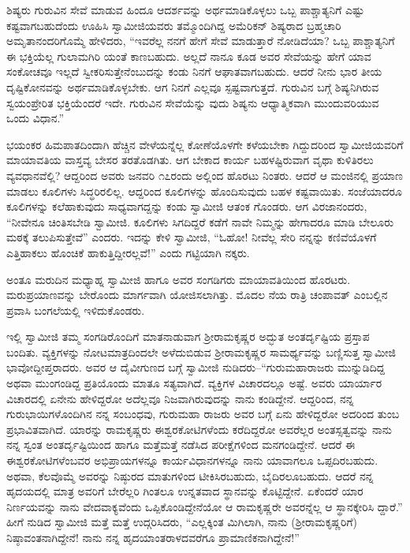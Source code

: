 ಶಿಷ್ಯರು ಗುರುವಿನ ಸೇವೆ ಮಾಡುವ ಹಿಂದೂ ಆದರ್ಶವನ್ನು ಅರ್ಥಮಾಡಿಕೊಳ್ಳಲು ಒಬ್ಬ ಪಾಶ್ಚಾತ್ಯನಿಗೆ ಎಷ್ಟು ಕಷ್ಟವಾಗಬಹುದೆಂದು ಊಹಿಸಿ ಸ್ವಾಮೀಜಿಯವರು ತಮ್ಮೊಂದಿಗಿದ್ದ ಅಮೆರಿಕನ್ ಶಿಷ್ಯರಾದ ಬ್ರಹ್ಮಚಾರಿ ಅಮೃತಾನಂದರಿಗೊಮ್ಮೆ ಹೇಳಿದರು, “ಇವರೆಲ್ಲ ನನಗೆ ಹೇಗೆ ಸೇವೆ ಮಾಡುತ್ತಾರೆ ನೋಡಿದೆಯಾ? ಒಬ್ಬ ಪಾಶ್ಚಾತ್ಯನಿಗೆ ಈ ಭಕ್ತಿಯೆಲ್ಲ ಗುಲಾಮಗಿರಿ ಯಂತೆ ಕಾಣಬಹುದು. ಅಲ್ಲದೆ ನಾನೂ ಕೂಡ ಅವರ ಸೇವೆಯನ್ನು ಹೇಗೆ ಯಾವ ಸಂಕೋಚವೂ ಇಲ್ಲದೆ ಸ್ವೀಕರಿಸುತ್ತೇನೆಂಬುದನ್ನು ಕಂಡು ನಿನಗೆ ಆಘಾತವಾಗಬಹುದು. ಆದರೆ ನೀನು ಭಾರ ತೀಯ ದೃಷ್ಟಿಕೋನವನ್ನು ಅರ್ಥಮಾಡಿಕೊಳ್ಳಬೇಕು. ಆಗ ನಿನಗೆ ಎಲ್ಲವೂ ಸ್ಪಷ್ಟವಾಗುತ್ತದೆ. ಗುರುವಿನ ಬಗ್ಗೆ ಶಿಷ್ಯನಿಗಿರುವ ಸ್ವಯಂಪ್ರೇರಿತ ಭಕ್ತಿಯೆಂದರೆ ಇದೇ. ಗುರುವಿನ ಸೇವೆಯೆನ್ನು ವುದು ಶಿಷ್ಯನು ಆಧ್ಯಾತ್ಮಿಕವಾಗಿ ಮುಂದುವರಿಯುವ ಒಂದು ವಿಧಾನ.”

ಭಯಂಕರ ಹಿಮಪಾತದಿಂದಾಗಿ ಹೆಚ್ಚಿನ ವೇಳೆಯನ್ನೆಲ್ಲ ಕೋಣೆಯೊಳಗೇ ಕಳೆಯಬೇಕಾ ಗಿದ್ದುದರಿಂದ ಸ್ವಾಮೀಜಿಯವರಿಗೆ ಮಾಯಾವತಿಯ ವಾಸ್ತವ್ಯ ಬೇಸರ ತರತೊಡಗಿತು. ಆಗ ಬೇಕಾದ ಕಾರ್ಯ ಬಹಳಷ್ಟಿರುವಾಗ ವೃಥಾ ಕುಳಿತಿರಲು ವ್ಯವಧಾನವೆಲ್ಲಿ? ಆದ್ದರಿಂದ ಅವರು ಜನವರಿ ೧೭ರಂದು ಅಲ್ಲಿಂದ ಹೊರಟು ನಿಂತರು. ಆದರೆ ಆ ಮಂಜಿನಲ್ಲಿ ಪ್ರಯಾಣ ಮಾಡಲು ಕೂಲಿಗಳು ಸಿದ್ಧರಿರಲಿಲ್ಲ. ಆದ್ದರಿಂದ ಕೂಲಿಗಳನ್ನು ಹೊಂದಿಸುವುದು ಬಹಳ ಕಷ್ಟವಾಯಿತು. ಸಂಜೆಯಾದರೂ ಕೂಲಿಗಳನ್ನು ಕಲೆಹಾಕುವುದು ಸಾಧ್ಯವಾಗದ್ದನ್ನು ಕಂಡು ಸ್ವಾಮೀಜಿ ಆತಂಕ ಗೊಂಡರು. ಆಗ ವಿರಜಾನಂದರು, “ನೀವೇನೂ ಚಿಂತಿಸಬೇಡಿ ಸ್ವಾಮೀಜಿ. ಕೂಲಿಗಳು ಸಿಗದಿದ್ದರೆ ಕಡೆಗೆ ನಾವೇ ನಿಮ್ಮನ್ನು ಹೇಗಾದರೂ ಮಾಡಿ ಬೇಲೂರು ಮಠಕ್ಕೆ ತಲುಪಿಸುತ್ತೇವೆ” ಎಂದರು. ಇದನ್ನು ಕೇಳಿ ಸ್ವಾಮೀಜಿ, “ಓಹೋ! ನೀವೆಲ್ಲ ಸೇರಿ ನನ್ನನ್ನು ಕಣಿವೆಯೊಳಗೆ ಎತ್ತಿಹಾಕಲು ಹೊಂಚಿಕೆ ಹಾಕುತ್ತಿದ್ದೀರಲ್ಲವೆ!” ಎಂದು ಗಟ್ಟಿಯಾಗಿ ನಕ್ಕರು.

ಅಂತೂ ಮರುದಿನ ಮಧ್ಯಾಹ್ನ ಸ್ವಾಮೀಜಿ ಹಾಗೂ ಅವರ ಸಂಗಡಿಗರು ಮಾಯಾವತಿಯಿಂದ ಹೊರಟರು. ಮರುಪ್ರಯಾಣವನ್ನು ಬೇರೊಂದು ಮಾರ್ಗವಾಗಿ ಯೋಜಿಸಲಾಗಿತ್ತು. ಮೊದಲ ನೆಯ ರಾತ್ರಿ ಚಂಪಾವತ್ ಎಂಬಲ್ಲಿನ ಪ್ರವಾಸಿ ಬಂಗಲೆಯಲ್ಲಿ ಇಳಿದುಕೊಂಡರು.

ಇಲ್ಲಿ ಸ್ವಾಮೀಜಿ ತಮ್ಮ ಸಂಗಡಿರೊಂದಿಗೆ ಮಾತನಾಡುವಾಗ ಶ್ರೀರಾಮಕೃಷ್ಣರ ಅದ್ಭುತ ಅಂತರ್ದೃಷ್ಟಿಯ ಪ್ರಸ್ತಾಪ ಬಂದಿತು. ವ್ಯಕ್ತಿಗಳನ್ನು ನೋಟಮಾತ್ರದಿಂದಲೇ ಅಳೆದುಬಿಡುವ ಶ್ರೀರಾಮಕೃಷ್ಣರ ಸಾಮರ್ಥ್ಯವನ್ನು ಬಣ್ಣಿಸುತ್ತ ಸ್ವಾಮೀಜಿ ಭಾವೋದ್ದೀಪ್ತರಾದರು. ಅವರ ಆ ದೈವೀಗುಣದ ಬಗ್ಗೆ ಸ್ವಾಮೀಜಿ ನುಡಿದರು–“ಗುರುಮಹಾರಾಜರು ಮುನ್ನುಡಿದಿದ್ದ ಅಥವಾ ಮುಂಗಂಡಿದ್ದ ಪ್ರತಿಯೊಂದು ಮಾತೂ ಸತ್ಯವಾಗಿದೆ. ವ್ಯಕ್ತಿಗಳ ವಿಚಾರದಲ್ಲೂ ಅಷ್ಟೆ. ಅವರು ಯಾರ್ಯಾರ ವಿಚಾರದಲ್ಲಿ ಏನೇನು ಹೇಳಿದ್ದರೋ ಅದೆಲ್ಲವೂ ನಿಜವಾಗಿರುವುದನ್ನು ನಾನು ಕಂಡಿದ್ದೇನೆ. ಆದ್ದರಿಂದ, ನನ್ನ ಗುರುಭಾಯಿಗಳೊಂದಿಗಿನ ನನ್ನ ಸಂಬಂಧವು, ಗುರುಮಹಾ ರಾಜರು ಅವರ ಬಗ್ಗೆ ಏನು ಹೇಳಿದ್ದರೋ ಅದರಿಂದ ತುಂಬ ಪ್ರಭಾವಿತವಾಗಿದೆ. ಯಾರನ್ನು ರಾಮಕೃಷ್ಣರು ಈಶ್ವರಕೋಟಿಗಳೆಂದು ಕರೆದಿದ್ದರೋ ಅವರೆಲ್ಲರ ಅಂತಸ್ಸತ್ವವನ್ನು ನಾನು ನನ್ನ ಸ್ವಂತ ಅಂತರ್ದೃಷ್ಟಿಯಿಂದ ಹಾಗೂ ಮತ್ತೆಮತ್ತೆ ನಡೆಸಿದ ಪರೀಕ್ಷೆಗಳಿಂದ ಮನಗಂಡಿದ್ದೇನೆ. ಆದರೆ ಈ ಈಶ್ವರಕೋಟಿಗಳೆಂಬವರ ಅಭಿಪ್ರಾಯಗಳನ್ನೂ ಕಾರ್ಯವಿಧಾನಗಳನ್ನೂ ನಾನು ಯಾವಾಗಲೂ ಒಪ್ಪದಿರಬಹುದು. ಅಥವಾ, ಕೆಲವೊಮ್ಮೆ ಅವರನ್ನು ನಿಷ್ಠುರದ ಮಾತುಗಳಿಂದ ಟೀಕಿಸಿರಬಹುದು, ಬೈದಿರಲೂಬಹುದು. ಆದರೆ ನನ್ನ ಹೃದಯದಲ್ಲಿ ಮಾತ್ರ ಅವರಿಗೆ ಬೇರೆಲ್ಲರಿ ಗಿಂತಲೂ ಉನ್ನತವಾದ ಸ್ಥಾನವನ್ನು ಕೊಟ್ಟಿದ್ದೇನೆ. ಏಕೆಂದರೆ ಯಾರ ನಿರ್ಣಯವನ್ನು ನಾನು ವೇದವಾಕ್ಯವೆಂದು ಒಪ್ಪಿಕೊಂಡಿದ್ದೇನೆಯೋ ಆ ರಾಮಕೃಷ್ಣರೇ ಅವರನ್ನೆಲ್ಲ ಆ ಸ್ಥಾನಕ್ಕೇರಿಸಿ ದ್ದಾರೆ.” ಹೀಗೆ ನುಡಿದ ಸ್ವಾಮೀಜಿ ಮತ್ತೆ ಮತ್ತೆ ಉದ್ಗರಿಸಿದರು, “ಎಲ್ಲಕ್ಕಿಂತ ಮಿಗಿಲಾಗಿ, ನಾನು (ಶ್ರೀರಾಮಕೃಷ್ಣರಿಗೆ) ನಿಷ್ಠಾವಂತನಾಗಿದ್ದೇನೆ! ನಾನು ನನ್ನ ಹೃದಯಾಂತರಾಳದವರೆಗೂ ಪ್ರಾಮಾಣಿಕನಾಗಿದ್ದೇನೆ!”

